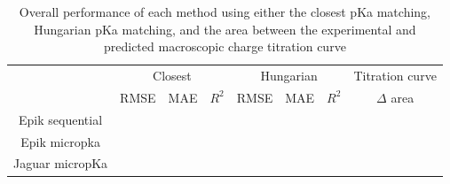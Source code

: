 \documentclass[9pt,lineno,final]{elife}
\begin{document}
\begin{table}[H]
	\centering
	\caption{Overall performance of each method using either the closest pKa matching, Hungarian pKa matching,  and the area between the experimental and predicted macroscopic charge titration curve}
	\label{tab:overview-performance}
	\begin{tabular}{c|ccc|ccc|c}
		& \multicolumn{3}{c|}{Closest} & \multicolumn{3}{c|}{Hungarian} & Titration curve \\ \cline{2-8} 
		                & RMSE & MAE & $R^2$ & RMSE & MAE & $R^2$ & $\Delta $ area \\ \hline
		Epik sequential &      &     &       &      &     &       &           \\
		Epik micropka   &      &     &       &      &     &       &           \\
		Jaguar micropKa &      &     &       &      &     &       &           
	\end{tabular}
\end{table}
    
\end{document}
